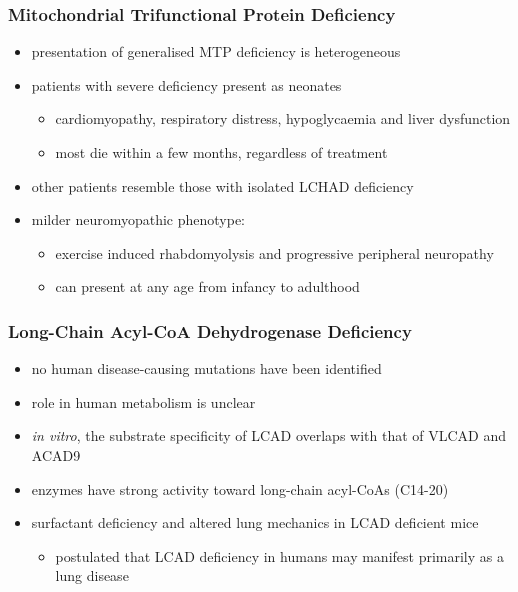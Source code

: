 \documentclass{scrartcl}
\begin{document}
\subsubsection{Mitochondrial Trifunctional Protein Deficiency}
\label{sec:org32d0996}
\begin{itemize}
\item presentation of generalised MTP deficiency is heterogeneous
\item patients with severe deficiency present as neonates
\begin{itemize}
\item cardiomyopathy, respiratory distress, hypoglycaemia and liver dysfunction
\item most die within a few months, regardless of treatment
\end{itemize}
\item other patients resemble those with isolated LCHAD deficiency
\item milder neuromyopathic phenotype:
\begin{itemize}
\item exercise induced rhabdomyolysis and progressive peripheral
neuropathy
\item can present at any age from infancy to adulthood
\end{itemize}
\end{itemize}

\subsubsection{Long-Chain Acyl-CoA Dehydrogenase Deficiency}
\label{sec:orgeb0d7bd}
\begin{itemize}
\item no human disease-causing mutations have been identified
\item role  in  human  metabolism  is unclear
\item \emph{in vitro}, the substrate specificity of LCAD overlaps with that of
VLCAD and ACAD9
\item enzymes have strong activity toward long-chain acyl-CoAs (C14-20)
\item surfactant deficiency and altered lung mechanics in LCAD deficient
mice
\begin{itemize}
\item postulated that LCAD deficiency in humans may manifest primarily
as a lung disease
\end{itemize}
\end{itemize}
\end{document}
